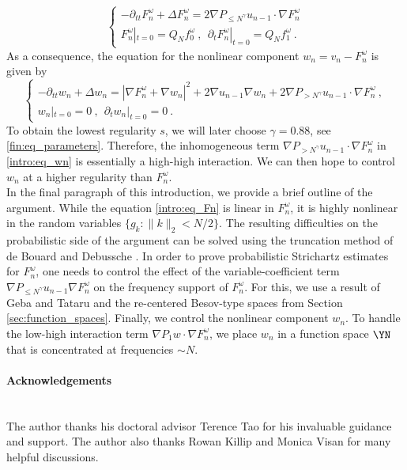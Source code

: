 \documentclass[11pt]{article}
\begin{document}
\begin{equation}\label{intro:eq_Fn}
\begin{cases}
-\partial_{tt} F_{n}^\omega+\Delta F_{n}^\omega =  2  \nabla P_{\leq N^\gamma} u_{n-1} \cdot \nabla F_{n}^\omega\\
F_{n}^\omega|_{t=0} = Q_N f_0^\omega~,~~ \partial_t F_{n}^\omega|_{t=0} = Q_N f_1^\omega~. 
\end{cases}
\end{equation}
As a consequence, the equation for the nonlinear component \( w_n = v_n -F_n^\omega \) is given by 
 \begin{equation}\label{intro:eq_wn}
 \begin{cases}
 -\partial_{tt} w_n + \Delta w_n =|\nabla F_n^\omega + \nabla w_n|^2 + 2 \nabla u_{n-1} \nabla w_n + 2  \nabla P_{>N^\gamma} u_{n-1}  \cdot \nabla F_n^\omega~,\\
 w_n|_{t=0} = 0~, ~~ \partial_t w_n|_{t=0} =0~. 
 \end{cases}
 \end{equation}
 To obtain the lowest regularity \( s \), we will later choose \( \gamma=0.88 \), see \eqref{fin:eq_parameters}. 
 Therefore, the inhomogeneous term \( \nabla P_{> N^\gamma} u_{n-1} \cdot \nabla F_n^\omega \) in \eqref{intro:eq_wn} is essentially a high-high interaction. We can then hope to control \( w_n \) at a higher regularity than \( F_n^\omega \). \\
In the final paragraph of this introduction, we provide a brief outline of the argument. While the equation \eqref{intro:eq_Fn} is linear in \( F_n^\omega \), it is highly nonlinear in the random variables \( \{ g_k \colon \| k \|_2 < N/2 \} \). The resulting difficulties on the probabilistic side of the argument can be solved using the truncation method of de Bouard and Debussche \cite{BD99}. In order to prove probabilistic Strichartz estimates for \( F_n^\omega \), one needs to control the effect of the variable-coefficient term \( \nabla P_{\leq N^\gamma} u_{n-1} \nabla F_n^\omega \) on the frequency support of \( F_n^\omega \). For this, we use a result of Geba and Tataru \cite{TG05} and the re-centered Besov-type spaces from Section \ref{sec:function_spaces}. Finally, we control the nonlinear component \( w_n \). To handle the low-high interaction term \( \nabla P_1 w \cdot \nabla F_n^\omega \), we place \( w_n \) in a function space \( \YN \) that is concentrated at frequencies \( \sim N \).

\paragraph{Acknowledgements}~\\
The author thanks his doctoral advisor Terence Tao for his invaluable guidance and support. The author also thanks Rowan Killip and Monica Visan for many helpful discussions.
\end{document}
